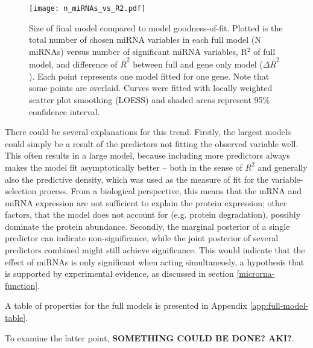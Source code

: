 \begin{figure}[htb]
  \centering
  \texttt{[image: n\_miRNAs\_vs\_R2.pdf]}
  \caption{Size of final model compared to model goodness-of-fit. Plotted is the total number of chosen miRNA variables in each full model (N miRNAs) versus number of significant miRNA variables, R$^2$ of full model, and difference of $\bar{R}^2$ between full and gene only model ($\Delta\bar{R}^2$). Each point represents one model fitted for one gene. Note that some points are overlaid. Curves were fitted with locally weighted scatter plot smoothing (LOESS) and shaded areas represent 95\% confidence interval. \label{n-miRNAs-vs-R2}}
\end{figure}

There could be several explanations for this trend. Firstly, the largest
models could simply be a result of the predictors not fitting the observed
variable well. This often results in a large model, because including more
predictors always makes the model fit asymptotically better -- both in the
sense of $R^2$ and generally also the predictive density, which was used as
the measure of fit for the variable-selection process. From a biological
perspective, this means that the mRNA and miRNA expression are not sufficient
to explain the protein expression; other factors, that the model does not
account for (e.g. protein degradation), possibly dominate the protein
abundance. Secondly, the marginal posterior of a single predictor can indicate
non-significance, while the joint posterior of several predictors combined
might still achieve significance. This would indicate that the effect of
miRNAs is only significant when acting simultaneosly, a hypothesis that is
supported by experimental evidence, as discussed in section
\ref{microrna-function}.

A table of properties for the full models is presented in Appendix
\ref{app:full-model-table}.

To examine the latter point, \textbf{SOMETHING COULD BE DONE? AKI?}.
